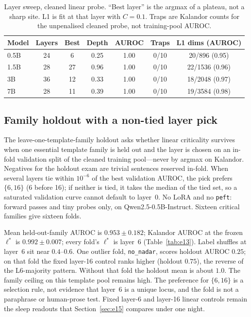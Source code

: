 \documentclass[11pt,a4paper]{article}
\begin{document}
\begin{table}[t]
\centering
\caption{Layer sweep, cleaned linear probe. ``Best layer'' is the argmax of a plateau, not a sharp site. L1 is fit at that layer with $C{=}0.1$. Traps are Kalandor counts for the unpenalised cleaned probe, not training-pool AUROC.}
\label{tab:e7}
\small
\begin{tabular}{lcccccc}
\toprule
Model & Layers & Best & Depth & AUROC & Traps & L1 dims (AUROC) \\
\midrule
0.5B & 24 & 6 & 0.25 & 1.00 & 0/10 & 20/896 (0.95) \\
1.5B & 28 & 27 & 0.96 & 1.00 & 0/10 & 22/1536 (0.96) \\
3B & 36 & 12 & 0.33 & 1.00 & 0/10 & 18/2048 (0.97) \\
7B & 28 & 11 & 0.39 & 1.00 & 0/10 & 19/3584 (0.98) \\
\bottomrule
\end{tabular}
\end{table}

\subsection{Family holdout with a non-tied layer pick}
\label{sec:e13}

The leave-one-template-family holdout asks whether linear criticality survives when one essential template family is held out and the layer is chosen on an in-fold validation split of the cleaned training pool---never by argmax on Kalandor.
Negatives for the holdout exam are trivial sentences reserved in-fold.
When several layers tie within $10^{-6}$ of the best validation AUROC, the pick prefers $\{6,16\}$ (6 before 16); if neither is tied, it takes the median of the tied set, so a saturated validation curve cannot default to layer~0.
No LoRA and no \texttt{peft}: forward passes and tiny probes only, on Qwen2.5-0.5B-Instruct.
Sixteen critical families give sixteen folds.

Mean held-out-family AUROC is $0.953{\pm}0.182$; Kalandor AUROC at the frozen $\ell^*$ is $0.992{\pm}0.007$; every fold's $\ell^*$ is layer~6 (Table~\ref{tab:e13}).
Label shuffles at layer~6 sit near $0.4$--$0.6$.
One outlier fold, \texttt{no\_nadar}, scores holdout AUROC $0.25$; on that fold the fixed layer-16 control ranks higher (holdout $0.75$), the reverse of the L6-majority pattern.
Without that fold the holdout mean is about $1.0$.
The family ceiling on this template pool remains high.
The preference for $\{6,16\}$ is a selection rule, not evidence that layer~6 is a unique locus, and the fold is not a paraphrase or human-prose test.
Fixed layer-6 and layer-16 linear controls remain the sleep readouts that Section~\ref{sec:e15} compares under one night.
\end{document}
